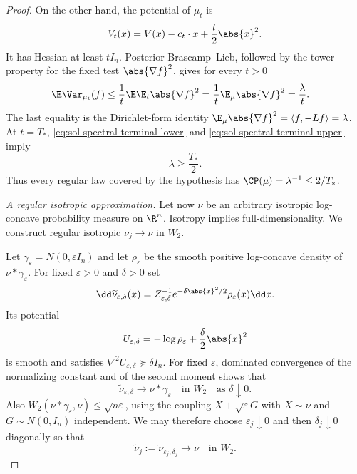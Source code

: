 \documentclass[../main.tex]{subfiles}
\begin{document}
\begin{proof}
On the other hand, the potential of $\mu_t$ is
\[
  V_t(x)=V(x)-c_t\cdot x+\frac t2\abs{x}^2.
\]
It has Hessian at least $tI_n$.  Posterior Brascamp--Lieb, followed by the tower property for
the fixed test $\abs{\nabla f}^2$, gives for every $t>0$
\begin{align}
  \E\Var_{\mu_t}(f)
  &\le\frac1t\E\E_t\abs{\nabla f}^2
   =\frac1t\E_\mu\abs{\nabla f}^2 
   =\frac\lambda t.
  \label{eq:sol-spectral-terminal-upper}
\end{align}
The last equality is the Dirichlet-form identity
$\E_\mu\abs{\nabla f}^2=\langle f,-Lf\rangle=\lambda$.
At $t=T_*$, \eqref{eq:sol-spectral-terminal-lower} and
\eqref{eq:sol-spectral-terminal-upper} imply
\begin{equation}
  \lambda\ge\frac{T_*}{2}.
  \label{eq:sol-spectral-regular-gap}
\end{equation}
Thus every regular law covered by the hypothesis has
$\CP(\mu)=\lambda^{-1}\le2/T_*$.

\medskip
\noindent\emph{A regular isotropic approximation.}
Let now $\nu$ be an arbitrary isotropic log-concave probability measure on $\R^n$.  Isotropy
implies full-dimensionality.  We construct regular isotropic $\nu_j\to\nu$ in $W_2$.

Let $\gamma_\varepsilon=N(0,\varepsilon I_n)$ and let $\rho_\varepsilon$ be the smooth positive
log-concave density of $\nu*\gamma_\varepsilon$.  For fixed $\varepsilon>0$ and $\delta>0$ set
\begin{equation}
  \dd\widetilde\nu_{\varepsilon,\delta}(x)
  =Z_{\varepsilon,\delta}^{-1}
   e^{-\delta\abs{x}^2/2}\rho_\varepsilon(x)\dd x.
  \label{eq:sol-spectral-tilted-approximation}
\end{equation}
Its potential
\[
  U_{\varepsilon,\delta}=-\log\rho_\varepsilon+\frac\delta2\abs{x}^2
\]
is smooth and satisfies $\nabla^2U_{\varepsilon,\delta}\succeq\delta I_n$.
For fixed $\varepsilon$, dominated convergence of the normalizing constant and of the second
moment shows that
\[
  \widetilde\nu_{\varepsilon,\delta}\longrightarrow
  \nu*\gamma_\varepsilon
  \quad\text{in }W_2\quad\text{as }\delta\downarrow0.
\]
Also
$W_2(\nu*\gamma_\varepsilon,\nu)\le\sqrt{n\varepsilon}$, using the coupling
$X+\sqrt\varepsilon G$ with $X\sim\nu$ and $G\sim N(0,I_n)$ independent.  We may therefore
choose $\varepsilon_j\downarrow0$ and then $\delta_j\downarrow0$ diagonally so that
\[
  \widetilde\nu_j:=\widetilde\nu_{\varepsilon_j,\delta_j}\longrightarrow\nu
  \quad\text{in }W_2.
\]


\end{proof}
\end{document}
